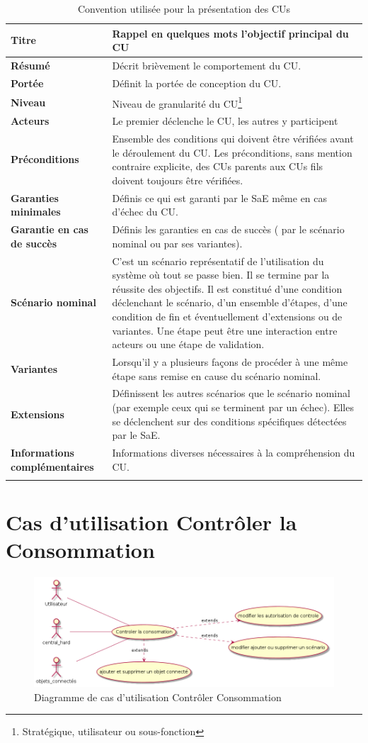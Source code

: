\documentclass[10pt,a4paper]{report}
\renewcommand{\arraystretch}{1.2}
\begin{document}
{
\renewcommand{\arraystretch}{1.2}
\begin{longtable}{| p{5cm} | p{11cm} |}
	\hline
	\cellcolor{lightgray}\textbf{\textbf{Titre}} & \cellcolor{lightgray}\textbf{Rappel en quelques mots l'objectif principal du CU}\tabularnewline
	\hline
	\textbf{Résumé} & Décrit brièvement le comportement du CU.\tabularnewline
	\hline
	\textbf{Portée} & Définit la portée de conception du CU.\tabularnewline
	\hline
	\textbf{Niveau} & Niveau de granularité du CU\footnote{Stratégique, utilisateur ou sous-fonction}\tabularnewline
	\hline
	\textbf{Acteurs} & Le premier déclenche le CU, les autres y participent\tabularnewline
	\hline
	\textbf{Préconditions } & Ensemble des conditions qui doivent être vérifiées avant le déroulement du CU. Les préconditions, sans mention contraire explicite, des CUs parents aux CUs fils doivent toujours être vérifiées.\tabularnewline
	\hline
	\textbf{Garanties minimales} & Définis ce qui est garanti par le SaE même en cas d'échec du CU.\tabularnewline
	\hline
	\textbf{Garantie en cas de succès} & Définis les garanties en cas de succès ( par le scénario nominal ou par ses variantes).\tabularnewline
	\hline
	\textbf{Scénario nominal} & C'est un scénario représentatif de l'utilisation du système où tout se passe bien. Il se termine par la réussite des objectifs. Il est constitué d'une condition déclenchant le scénario, d'un ensemble d'étapes, d'une condition de fin et éventuellement d'extensions ou de variantes. Une étape peut être une interaction entre acteurs ou une étape de validation.\tabularnewline
	\hline
	\textbf{Variantes} & Lorsqu'il y a plusieurs façons de procéder à une même étape sans remise en cause du scénario nominal.\tabularnewline
	\hline
	\textbf{Extensions} & Définissent les autres scénarios que le scénario nominal (par exemple ceux qui se terminent par un échec). Elles se déclenchent sur des conditions spécifiques détectées par le SaE.\tabularnewline
	\hline
	\textbf{Informations complémentaires} & Informations diverses nécessaires à la compréhension du CU.\tabularnewline
	\hline
\caption{Convention utilisée pour la présentation des CUs}	
\label{tableConventionCU}
\end{longtable}
}

		\section{Cas d'utilisation Contrôler la Consommation}

\begin{figure}[H]
	\centering
	\includegraphics[scale=0.55]{diagCU_ControlerConso}
	\caption{Diagramme de cas d'utilisation Contrôler Consommation}
	\label{diagCuControlerConso}
\end{figure}
\end{document}
